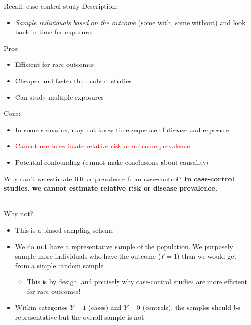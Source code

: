 \documentclass[10pt,t]{beamer}
\begin{document}
\begin{frame}{Recall: case-control study}
	Description:
	\begin{itemize}
		\item \textit{Sample individuals based on the outcome} (some with, some without) and look back in time for exposure. 
	\end{itemize}\pause
	Pros:\pause
	\begin{itemize}
		\item Efficient for rare outcomes\pause
		\item Cheaper and faster than cohort studies\pause
		\item Can study multiple exposures\pause
	\end{itemize}
	
	Cons:\pause
	\begin{itemize}
		\item In some scenarios, may not know time sequence of disease and exposure\pause
		\item \textcolor{red}{Cannot use to estimate relative risk or outcome prevalence}\pause
		\item Potential confounding (cannot make conclusions about causality)
	\end{itemize}
\end{frame}

\begin{frame}{Why can't we estimate RR or prevalence from case-control?}
	\textbf{In case-control studies, we cannot estimate relative risk or disease prevalence.}
	\\ ~\
	
	Why not? 
	\begin{itemize}
		\item This is a biased sampling scheme
		\item We do \textbf{not} have a representative sample of the population. We purposely sample more individuals who have the outcome ($Y = 1$) than we would 
		get from a simple random sample
			\begin{itemize}
				\item This is by design, and precisely why case-control studies are more efficient for rare outcomes!
			\end{itemize}
		\item Within categories $Y = 1$ (cases) and $Y = 0$ (controls), the samples should be representative but the overall sample is not
	\end{itemize} 
\end{frame}
\end{document}
